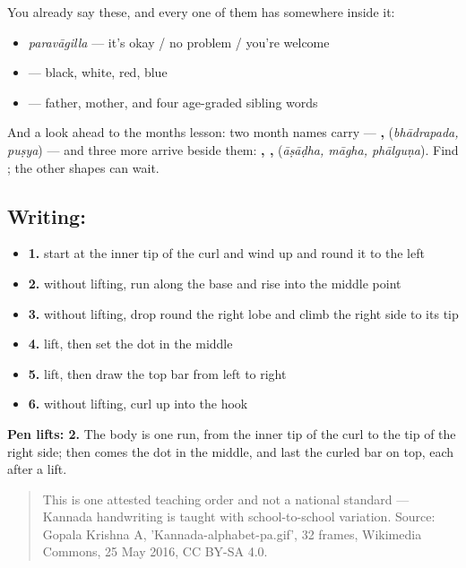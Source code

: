 You already say these, and every one of them has  somewhere inside it:

\begin{itemize}
\raggedright
  \item \textbf{} \emph{paravāgilla} — it's okay / no problem / you're welcome
  \item \textbf{   } — black, white, red, blue
  \item \textbf{     } — father, mother, and four age-graded sibling words
\end{itemize}

And a look ahead to the months lesson: two month names carry  — \textbf{, } (\emph{bhādrapada, puṣya}) — and three more arrive beside them: \textbf{, , } (\emph{āṣāḍha, māgha, phālguṇa}). Find ; the other shapes can wait.

\subsection*{Writing: }

\begin{itemize}
\raggedright
  \item \textbf{1.} start at the inner tip of the curl and wind up and round it to the left
  \item \textbf{2.} without lifting, run along the base and rise into the middle point
  \item \textbf{3.} without lifting, drop round the right lobe and climb the right side to its tip
  \item \textbf{4.} lift, then set the dot in the middle
  \item \textbf{5.} lift, then draw the top bar from left to right
  \item \textbf{6.} without lifting, curl up into the hook
\end{itemize}

\textbf{Pen lifts: 2.} The body is one run, from the inner tip of the curl to the tip of the right side; then comes the dot in the middle, and last the curled bar on top, each after a lift.

\begin{quote}
This is one attested teaching order and not a national standard — Kannada handwriting is taught with school-to-school variation. Source: Gopala Krishna A, 'Kannada-alphabet-pa.gif', 32 frames, Wikimedia Commons, 25 May 2016, CC BY-SA 4.0.
\end{quote}

